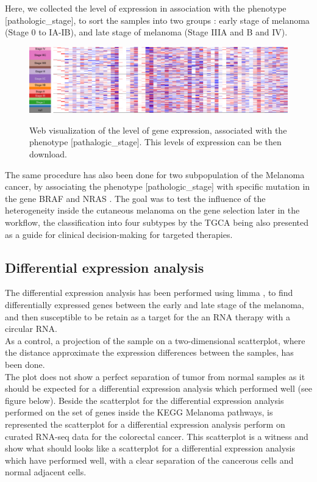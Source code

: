 \documentclass[a4paper,12pt]{report}
\begin{document}
Here, we collected the level of expression in association with the phenotype [pathologic\_stage], to sort the samples into two groups : early stage of melanoma (Stage 0 to IA-IB), and late stage of melanoma (Stage IIIA and B and IV)\cite{joint}. \\

\begin{figure}[H]
	\centering
	{\includegraphics[width=1\textwidth]{Xena_melanoma.pdf}}
	\caption{Web visualization of the level of gene expression, associated with the phenotype [pathalogic\_stage]. This levels of expression can be then download.}
\end{figure}

The same procedure has also been done for two subpopulation of the Melanoma cancer\cite{TGCA}, by associating the phenotype [pathologic\_stage] with specific mutation in the gene BRAF and NRAS \cite{TGCA}. The goal was to test the influence of the heterogeneity inside the cutaneous melanoma on the gene selection later in the workflow, the classification into four subtypes by the TGCA being also presented as a guide for clinical decision-making for targeted therapies\cite{TGCA}.\\

\subsection{Differential expression analysis}

The differential expression analysis has been performed using limma \cite{limma}, to find differentially expressed genes between the early and late stage of the melanoma, and then susceptible to be retain as a target for the an RNA therapy with a circular RNA.\\

As a control, a projection of the sample on a two-dimensional scatterplot, where the distance approximate the expression differences between the samples, has been done.\\

The plot does not show a perfect separation of tumor from normal samples as it should be expected for a differential expression analysis which performed well (see figure below). Beside the scatterplot for the differential expression analysis performed on the set of genes inside the KEGG Melanoma pathways, is represented the scatterplot for a differential expression analysis perform on curated RNA-seq data for the colorectal cancer\cite{curated}. This scatterplot is a witness and show what should looks like a scatterplot for a differential expression analysis which have performed well, with a clear separation of the cancerous cells and normal adjacent cells.\\
\end{document}
